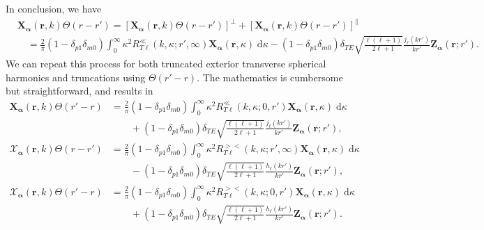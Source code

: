 In conclusion, we have
\begin{equation}
\begin{split}
&\mathbf{X}_{\bm{\alpha}}(\mathbf{r},k)\Theta(r - r') = \left[\mathbf{X}_{\bm{\alpha}}(\mathbf{r},k)\Theta(r - r')\right]^\perp + \left[\mathbf{X}_{\bm{\alpha}}(\mathbf{r},k)\Theta(r - r')\right]^\parallel\\
&\quad= \frac{2}{\pi}(1 - \delta_{p1}\delta_{m0})\int_0^\infty\kappa^2R_{T\ell}^\ll(k,\kappa;r',\infty)\mathbf{X}_{\bm{\alpha}}(\mathbf{r},\kappa)\;\mathrm{d}\kappa - (1 - \delta_{p1}\delta_{m0})\delta_{TE}\sqrt{\frac{\ell(\ell + 1)}{2\ell + 1}}\frac{j_\ell(kr')}{kr'}\mathbf{Z}_{\bm{\alpha}}(\mathbf{r};r').
\end{split}
\end{equation}
We can repeat this process for both truncated exterior transverse spherical harmonics and truncations using $\Theta(r' - r)$. The mathematics is cumbersome but straightforward, and results in
\begin{equation}
\begin{split}
\mathbf{X}_{\bm{\alpha}}(\mathbf{r},k)\Theta(r' - r) &= \frac{2}{\pi}(1 - \delta_{p1}\delta_{m0})\int_0^\infty\kappa^2R_{T\ell}^\ll(k,\kappa;0,r')\mathbf{X}_{\bm{\alpha}}(\mathbf{r},\kappa)\;\mathrm{d}\kappa\\
&\qquad + (1 - \delta_{p1}\delta_{m0})\delta_{TE}\sqrt{\frac{\ell(\ell + 1)}{2\ell + 1}}\frac{j_\ell(kr')}{kr'}\mathbf{Z}_{\bm{\alpha}}(\mathbf{r};r'),\\[1.0em]
\bm{\mathcal{X}}_{\bm{\alpha}}(\mathbf{r},k)\Theta(r - r') &= \frac{2}{\pi}(1 - \delta_{p1}\delta_{m0})\int_0^\infty\kappa^2R_{T\ell}^{><}(k,\kappa;r',\infty)\mathbf{X}_{\bm{\alpha}}(\mathbf{r},\kappa)\;\mathrm{d}\kappa\\
&\qquad- (1 - \delta_{p1}\delta_{m0})\delta_{TE}\sqrt{\frac{\ell(\ell + 1)}{2\ell + 1}}\frac{h_\ell(kr')}{kr'}\mathbf{Z}_{\bm{\alpha}}(\mathbf{r};r'),\\[1.0em]
\bm{\mathcal{X}}_{\bm{\alpha}}(\mathbf{r},k)\Theta(r' - r) &= \frac{2}{\pi}(1 - \delta_{p1}\delta_{m0})\int_0^\infty\kappa^2R_{T\ell}^{><}(k,\kappa;0,r')\mathbf{X}_{\bm{\alpha}}(\mathbf{r},\kappa)\;\mathrm{d}\kappa\\
&\qquad+ (1 - \delta_{p1}\delta_{m0})\delta_{TE}\sqrt{\frac{\ell(\ell + 1)}{2\ell + 1}}\frac{h_\ell(kr')}{kr'}\mathbf{Z}_{\bm{\alpha}}(\mathbf{r};r').
\end{split}
\end{equation}







